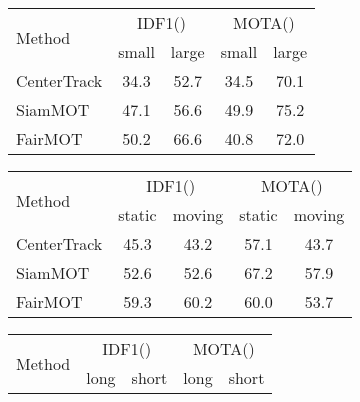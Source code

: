 \documentclass[runningheads]{llncs}
\begin{document}
\begin{table}[t]
\begin{minipage}[t]{0.45\textwidth}
    \small
    \centering
    \begin{tabular}{lcccc}
        \toprule
        \multirow{2}{*}{Method}  & \multicolumn{2}{c}{IDF1()} & \multicolumn{2}{c}{MOTA()}  \\
                     & small & large & small & large \\
        \midrule


        CenterTrack  & 34.3  & 52.7  & 34.5  & 70.1 \\
        SiamMOT  & 47.1  & 56.6  & 49.9  & 75.2 \\
        FairMOT  & 50.2  & 66.6  & 40.8  & 72.0 \\
        \bottomrule
    \end{tabular}
    \label{tab:small_large_size}
\end{minipage}
\hfill
\begin{minipage}[t]{0.5\textwidth}
    \small
    \centering
    \begin{tabular}{lcccc}
        \toprule
        \multirow{2}{*}{Method}  & \multicolumn{2}{c}{IDF1()} & \multicolumn{2}{c}{MOTA()}  \\
                 & static & moving & static & moving \\
        \midrule


        CenterTrack  & 45.3  & 43.2  & 57.1  & 43.7 \\
        SiamMOT  & 52.6  & 52.6  & 67.2  & 57.9 \\
        FairMOT  & 59.3  & 60.2  & 60.0  & 53.7 \\
        \bottomrule
    \end{tabular}
    \label{tab:static_moving}
\end{minipage}
\begin{minipage}[t]{0.45\textwidth}
    \small
    \centering
    \begin{tabular}{lcccc}
        \toprule
        \multirow{2}{*}{Method}  & \multicolumn{2}{c}{IDF1()} & \multicolumn{2}{c}{MOTA()}  \\
                     & long & short & long & short \\
        \midrule



\end{tabular}
\end{minipage}
\end{table}
\end{document}
